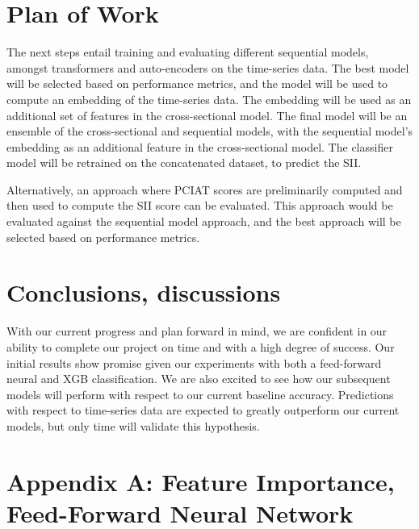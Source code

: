 \documentclass[12pt]{extarticle}
\begin{document}
\section{Plan of Work} 

    The next steps entail training and evaluating different sequential models, amongst transformers and auto-encoders on the time-series data. 
    The best model will be selected based on performance metrics, and the model will be used to compute an embedding of the time-series data. 
    The embedding will be used as an additional set of features in the cross-sectional model. 
    The final model will be an ensemble of the cross-sectional and sequential models, with the sequential model's embedding as an additional feature in the cross-sectional model. 
    The classifier model will be retrained on the concatenated dataset, to predict the SII.

    Alternatively, an approach where PCIAT scores are preliminarily computed and then used to compute the SII score can be evaluated. 
    This approach would be evaluated against the sequential model approach, and the best approach will be selected based on performance metrics.

\section{Conclusions, discussions}

    With our current progress and plan forward in mind, we are confident in our ability to complete our project on time and with a high degree of success.
    Our initial results show promise given our experiments with both a feed-forward neural and XGB classification.
    We are also excited to see how our subsequent models will perform with respect to our current baseline accuracy.
    Predictions with respect to time-series data are expected to greatly outperform our current models, but only time will validate this hypothesis.

\pagebreak



\pagebreak

\section*{Appendix A: Feature Importance, Feed-Forward Neural Network}
\end{document}
